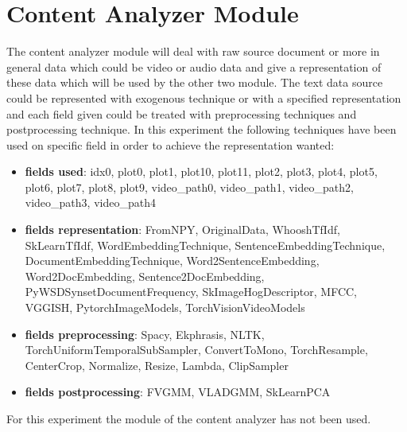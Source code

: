 

\section{Content Analyzer Module}\label{sec:ca}
The content analyzer module will deal with raw source document or more in general data which could be
video or audio data and give a representation of these data which will be used by the other two module.
The text data source could be represented with exogenous technique or with a specified representation
and each field given could be treated with preprocessing techniques and postprocessing technique.
In this experiment the following techniques have been used on specific field in order to achieve the
representation wanted:
\hfill\break
\hfill\break


\begin{itemize}
    \item \textbf{fields used}:  idx0, plot0, plot1, plot10, plot11, plot2, plot3, plot4, plot5, plot6, plot7, plot8, plot9, video\_path0, video\_path1, video\_path2, video\_path3, video\_path4

    \item \textbf{fields representation}:  FromNPY, OriginalData, WhooshTfIdf, SkLearnTfIdf, WordEmbeddingTechnique, SentenceEmbeddingTechnique, DocumentEmbeddingTechnique, Word2SentenceEmbedding, Word2DocEmbedding, Sentence2DocEmbedding, PyWSDSynsetDocumentFrequency, SkImageHogDescriptor, MFCC, VGGISH, PytorchImageModels, TorchVisionVideoModels

    \item \textbf{fields preprocessing}:  Spacy, Ekphrasis, NLTK, TorchUniformTemporalSubSampler, ConvertToMono, TorchResample, CenterCrop, Normalize, Resize, Lambda, ClipSampler

    \item \textbf{fields postprocessing}:  FVGMM, VLADGMM, SkLearnPCA
\end{itemize}


For this experiment the module of the content analyzer has not been used.
\hfill\break
\hfill\break



